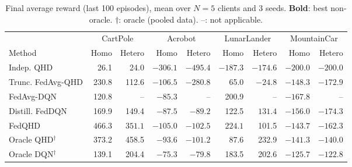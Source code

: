 \documentclass[sigconf,anonymous]{aamas}
\theoremstyle{plain}
\theoremstyle{definition}
\theoremstyle{remark}
\begin{document}
\begin{table}[t]
\centering
\caption{Final average reward (last 100 episodes), mean over $N{=}5$ clients and 3 seeds. \textbf{Bold}: best non-oracle. $\dagger$: oracle (pooled data). {--}: not applicable.}
\label{tab:main_results}
\setlength{\tabcolsep}{6pt}
\small
\begin{tabular}{l rr rr rr rr}
\toprule
& \multicolumn{2}{c}{CartPole} & \multicolumn{2}{c}{Acrobot} & \multicolumn{2}{c}{LunarLander} & \multicolumn{2}{c}{MountainCar} \\
\cmidrule(lr){2-3}\cmidrule(lr){4-5}\cmidrule(lr){6-7}\cmidrule(lr){8-9}
Method & Homo & Hetero & Homo & Hetero & Homo & Hetero & Homo & Hetero \\
\midrule
Indep. QHD          & 26.1            & 24.0            & $-306.1$        & $-495.4$        & $-187.3$        & $-174.6$        & $-200.0$        & $-200.0$ \\
Trunc. FedAvg-QHD   & 230.8           & 112.6           & $-106.5$        & $-280.8$        & 65.0            & $-24.8$         & $-148.3$        & $-172.9$ \\
FedAvg-DQN          & 120.8           & {--}            & $\mathbf{-85.3}$ & {--}           & 200.9           & {--}            & $-167.8$        & {--} \\
Distill. FedDQN     & 169.9           & 149.4           & $-87.5$         & $\mathbf{-89.2}$ & 122.5         & $\mathbf{131.4}$ & $-156.0$       & $-174.3$ \\
FedQHD              & $\mathbf{466.3}$ & $\mathbf{351.1}$ & $-105.0$       & $-102.5$        & $\mathbf{224.1}$ & 101.5          & $\mathbf{-143.7}$ & $\mathbf{-162.3}$ \\
\midrule
Oracle QHD$^\dagger$ & 373.2          & 458.5           & $-93.6$         & $-101.2$        & 87.6            & 232.9           & $-141.3$        & $-140.0$ \\
Oracle DQN$^\dagger$ & 139.1          & 204.4           & $-75.3$         & $-79.8$         & 183.5           & 202.6           & $-125.7$        & $-122.8$ \\
\bottomrule
\end{tabular}
\end{table}
\end{document}
